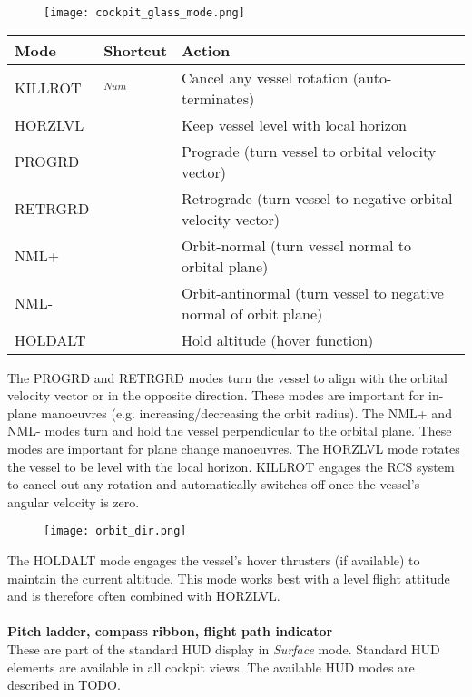 \documentclass[Orbiter User Manual.tex]{subfiles}
\begin{document}
\begin{figure}[H]
  \centering
  \texttt{[image: cockpit\_glass\_mode.png]}
\end{figure}

	\begin{longtable}{ |p{}|p{}|p{}| }
	\hline\rule{0pt}{2ex}
	\textbf{Mode} & \textbf{Shortcut} & \textbf{Action}\\
	\hline\rule{0pt}{2ex}
	KILLROT & \keystroke{5}$_{Num}$ & Cancel any vessel rotation (auto-terminates)\\
	\hline\rule{0pt}{2ex}
	HORZLVL & \keystroke{L} & Keep vessel level with local horizon\\
	\hline\rule{0pt}{2ex}
	PROGRD & \keystroke{[} & Prograde (turn vessel to orbital velocity vector)\\
	\hline\rule{0pt}{2ex}
	RETRGRD & \keystroke{]} & Retrograde (turn vessel to negative orbital velocity vector)\\
	\hline\rule{0pt}{2ex}
	NML+ & \keystroke{;} & Orbit-normal (turn vessel normal to orbital plane)\\
	\hline\rule{0pt}{2ex}
	NML- & \keystroke{'} & Orbit-antinormal (turn vessel to negative normal of orbit plane)\\
	\hline\rule{0pt}{2ex}
	HOLDALT & \keystroke{A} & Hold altitude (hover function)\\
	\hline
	\end{longtable}

\noindent
The PROGRD and RETRGRD modes turn the vessel to align with the orbital velocity vector or in the opposite direction. These modes are important for in-plane manoeuvres (e.g. increasing/decreasing the orbit radius). The NML+ and NML- modes turn and hold the vessel perpendicular to the orbital plane. These modes are important for plane change manoeuvres. The HORZLVL mode rotates the vessel to be level with the local horizon. KILLROT engages the RCS system to cancel out any rotation and automatically switches off once the vessel's angular velocity is zero.

\begin{figure}[H]
  \centering
  \texttt{[image: orbit\_dir.png]}
\end{figure}

\noindent
The HOLDALT mode engages the vessel's hover thrusters (if available) to maintain the current altitude. This mode works best with a level flight attitude and is therefore often combined with HORZLVL.\\
\\
\textbf{Pitch ladder, compass ribbon, flight path indicator}\\
These are part of the standard HUD display in \textit{Surface} mode. Standard HUD elements are available in all cockpit views. The available HUD modes are described in TODO.
\end{document}
